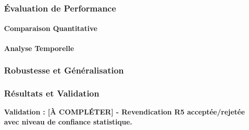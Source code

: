 \subsubsection{Évaluation de Performance}
\label{subsec:evaluation_performance}

\paragraph{Comparaison Quantitative}

\paragraph{Analyse Temporelle}

\subsubsection{Robustesse et Généralisation}
\label{subsec:robustesse_generalisation}

\subsubsection{Résultats et Validation}
\label{subsec:resultats_entrainement}

\textbf{Validation : [À COMPLÉTER] - Revendication R5 acceptée/rejetée avec niveau de confiance statistique.}



